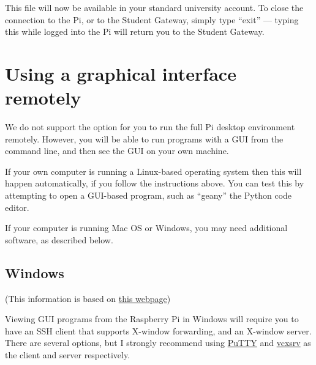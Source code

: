 This file will now be available in your standard university account.
To close the connection to the Pi, or to the Student Gateway, simply type ``exit'' --- typing this while logged into the Pi will return you to the Student Gateway.


\section{Using a graphical interface remotely}

We do not support the option for you to run the full Pi desktop environment remotely.
However, you will be able to run programs with a GUI from the command line, and then see the GUI on your own machine.

If your own computer is running a Linux-based operating system then this will happen automatically, if you follow the instructions above.
You can test this by attempting to open a GUI-based program, such as ``geany'' the Python code editor.

If your computer is running Mac OS or Windows, you may need additional software, as described below.

\subsection{Windows}

(This information is based on \href{https://superuser.com/questions/119792/how-to-use-x11-forwarding-with-putty}{this webpage})

Viewing GUI programs from the Raspberry Pi in Windows will require you to have an SSH client that supports X-window forwarding, and an X-window server.
There are several options, but I strongly recommend using \href{https://www.putty.org/}{PuTTY} and \href{https://sourceforge.net/projects/vcxsrv/}{vcxsrv} as the client and server respectively.

